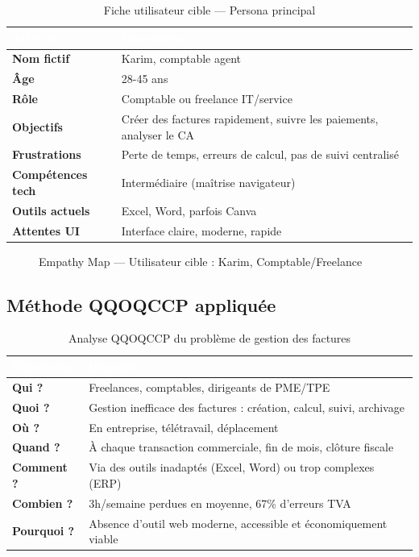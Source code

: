 \begin{table}[H]
\centering
\caption{Fiche utilisateur cible — Persona principal}
\label{tab:persona}
\begin{tabularx}{\textwidth}{|l|X|}
\hline
\rowcolor{emsiblue}\textcolor{white}{\textbf{Attribut}} & \textcolor{white}{\textbf{Description}} \\
\hline
\textbf{Nom fictif} & Karim, comptable agent \\
\textbf{Âge} & 28-45 ans \\
\textbf{Rôle} & Comptable ou freelance IT/service \\
\textbf{Objectifs} & Créer des factures rapidement, suivre les paiements, analyser le CA \\
\textbf{Frustrations} & Perte de temps, erreurs de calcul, pas de suivi centralisé \\
\textbf{Compétences tech} & Intermédiaire (maîtrise navigateur) \\
\textbf{Outils actuels} & Excel, Word, parfois Canva \\
\textbf{Attentes UI} & Interface claire, moderne, rapide \\
\hline
\end{tabularx}
\end{table}

\begin{figure}[H]
\centering
{}
\caption{Empathy Map — Utilisateur cible : Karim, Comptable/Freelance}
\label{fig:empathy_map}
\end{figure}

\subsection{Méthode QQOQCCP appliquée}

\begin{table}[H]
\centering
\caption{Analyse QQOQCCP du problème de gestion des factures}
\label{tab:qqoqccp}
\begin{tabularx}{\textwidth}{|l|X|}
\hline
\rowcolor{emsiblue}\textcolor{white}{\textbf{Dimension}} & \textcolor{white}{\textbf{Réponse}} \\
\hline
\textbf{Qui ?} & Freelances, comptables, dirigeants de PME/TPE \\
\textbf{Quoi ?} & Gestion inefficace des factures : création, calcul, suivi, archivage \\
\textbf{Où ?} & En entreprise, télétravail, déplacement \\
\textbf{Quand ?} & À chaque transaction commerciale, fin de mois, clôture fiscale \\
\textbf{Comment ?} & Via des outils inadaptés (Excel, Word) ou trop complexes (ERP) \\
\textbf{Combien ?} & 3h/semaine perdues en moyenne, 67\% d'erreurs TVA \\
\textbf{Pourquoi ?} & Absence d'outil web moderne, accessible et économiquement viable \\
\hline
\end{tabularx}
\end{table}

